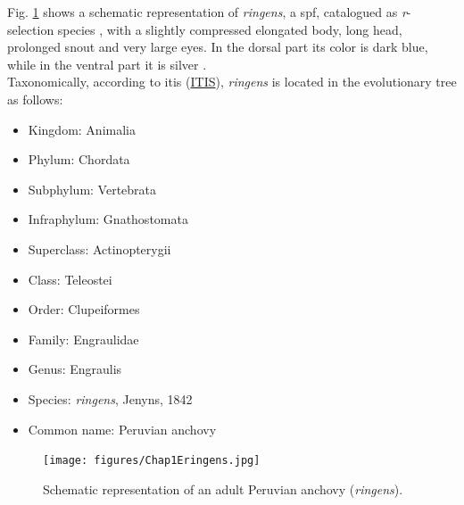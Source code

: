 Fig. \ref{Chap1Eringens} shows a schematic representation of \textit{\gls{ringens}}, a \acrshort{spf}, catalogued as \textit{r}-selection species \citep{Pianka1970}, with a slightly compressed elongated body, long head, prolonged snout and very large eyes. In the dorsal part its color is dark blue, while in the ventral part it is silver \citep{Whit1988}.\\

Taxonomically, according to \acrlong{itis} (\href{https://www.itis.gov/}{ITIS}), \textit{\gls{ringens}} is located in the evolutionary tree as follows:\\

\begin{itemize}
  \centering
  \item Kingdom: Animalia
  \item Phylum: Chordata
  \item Subphylum: Vertebrata
  \item Infraphylum: Gnathostomata
  \item Superclass: Actinopterygii
  \item Class: Teleostei
  \item Order: Clupeiformes
  \item Family: Engraulidae
  \item Genus: Engraulis
  \item Species: \textit{\gls{ringens}}, Jenyns, 1842
  \item Common name: Peruvian anchovy
\end{itemize}

\begin{figure}[!]
	\texttt{[image: figures/Chap1Eringens.jpg]}
	\centering
	\caption{Schematic representation of an adult Peruvian anchovy (\textit{\gls{ringens}}).}
	\label{Chap1Eringens}
\end{figure}


